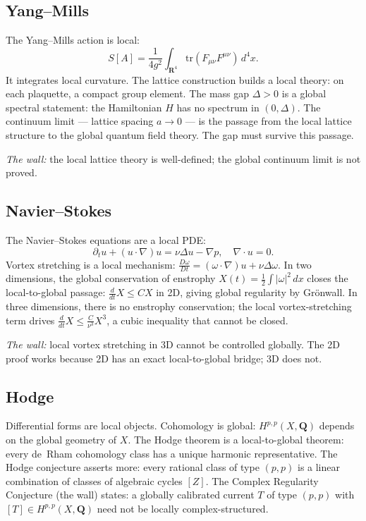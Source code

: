 \documentclass[12pt]{article}
\begin{document}
\subsection*{Yang--Mills}

The Yang--Mills action is local:
$$S[A] = \frac{1}{4g^2}\int_{\mathbf{R}^4} \mathrm{tr}(F_{\mu\nu}F^{\mu\nu})\,d^4x.$$
It integrates local curvature.
The lattice construction builds a local theory: on each plaquette,
a compact group element.
The mass gap $\Delta > 0$ is a global spectral statement:
the Hamiltonian $H$ has no spectrum in $(0,\Delta)$.
The continuum limit --- lattice spacing $a \to 0$ ---
is the passage from the local lattice structure
to the global quantum field theory.
The gap must survive this passage.

\textit{The wall:} the local lattice theory is well-defined;
the global continuum limit is not proved.

\subsection*{Navier--Stokes}

The Navier--Stokes equations are a local PDE:
$$\partial_t u + (u\cdot\nabla)u = \nu\Delta u - \nabla p, \quad \nabla\cdot u = 0.$$
Vortex stretching is a local mechanism:
$\frac{D\omega}{Dt} = (\omega\cdot\nabla)u + \nu\Delta\omega$.
In two dimensions, the global conservation of enstrophy
$X(t) = \tfrac{1}{2}\int |\omega|^2\,dx$
closes the local-to-global passage:
$\frac{d}{dt}X \leq CX$ in 2D, giving global regularity by Gr\"onwall.
In three dimensions, there is no enstrophy conservation;
the local vortex-stretching term drives
$\frac{d}{dt}X \leq \frac{C}{\nu^3}X^3$,
a cubic inequality that cannot be closed.

\textit{The wall:} local vortex stretching in 3D
cannot be controlled globally.
The 2D proof works because 2D has an exact local-to-global bridge;
3D does not.

\subsection*{Hodge}

Differential forms are local objects.
Cohomology is global:
$H^{p,p}(X, \mathbf{Q})$ depends on the global geometry of $X$.
The Hodge theorem is a local-to-global theorem:
every de~Rham cohomology class has a unique harmonic representative.
The Hodge conjecture asserts more:
every rational class of type $(p,p)$ is a linear combination of
classes of algebraic cycles $[Z]$.
The Complex Regularity Conjecture (the wall) states:
a globally calibrated current $T$ of type $(p,p)$
with $[T] \in H^{p,p}(X,\mathbf{Q})$
need not be locally complex-structured.
\end{document}
